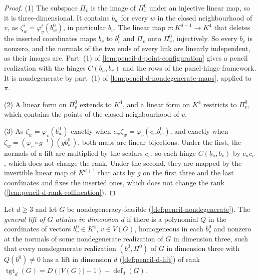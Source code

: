 \begin{proof}
  \leanok
  (1) The subspace $\Pi_v$ is the image of $\Pi^0_v$ under an injective
  linear map, so it is three-dimensional. It contains $b_w$ for every
  $w$ in the closed neighbourhood of $v$, as
  $\zeta^i_w = \varphi^i_v(b^0_w)$, in particular $b_v$. The linear map
  $\pi \colon K^{d+1} \to K^4$ that deletes the inserted coordinates
  maps $b_v$ to $b^0_v$ and $\Pi_v$ onto $\Pi^0_v$, injectively. So every
  $b_v$ is nonzero, and the normals of the two ends of every link are
  linearly independent, as their images are. Part~(1) of
  \cref{lem:pencil-d-point-configuration} gives a pencil realization with
  the hinges $C(b_u, b_v)$ and the rows of the panel-hinge framework. It
  is nondegenerate by part~(1) of \cref{lem:pencil-d-nondegenerate-maps},
  applied to $\pi$.

  (2) A linear form on $\Pi^0_v$ extends to $K^4$, and a linear form on
  $K^4$ restricts to $\Pi^0_v$, which contains the points of the closed
  neighbourhood of $v$.

  (3) As $\zeta_w = \varphi_v(b^0_w)$ exactly when
  $c_w \zeta_w = \varphi_v(c_w b^0_w)$, and exactly when
  $\zeta_w = (\varphi_v \circ g^{-1})(g b^0_w)$, both maps are linear
  bijections. Under the first, the normals of a lift are multiplied by
  the scalars $c_v$, so each hinge $C(b_u, b_v)$ by $c_u c_v$, which does
  not change the rank. Under the second, they are mapped by the invertible
  linear map of $K^{d+1}$ that acts by $g$ on the first three and the last
  coordinates and fixes the inserted ones, which does not change the rank
  (\cref{lem:pencil-d-rank-collineation}).
\end{proof}

\begin{definition}
  \label{def:pencil-d-lift-attains}
  \leanok
  Let $d \ge 3$ and let $G$ be nondegeneracy-feasible
  (\cref{def:pencil-nondegenerate}). The \emph{general lift of $G$ attains
  in dimension $d$} if there is a polynomial $Q$ in the coordinates of
  vectors $b^0_v \in K^4$, $v \in V(G)$, homogeneous in each $b^0_v$ and
  nonzero at the normals of some nondegenerate realization of $G$ in
  dimension three, such that every nondegenerate realization
  $(b^0, \Pi^0)$ of $G$ in dimension three with $Q(b^0) \ne 0$ has a lift
  in dimension $d$ (\cref{def:pencil-d-lift}) of rank
  $\operatorname{tgt}_d(G) = D(|V(G)| - 1) - \operatorname{def}_d(G)$.
\end{definition}

